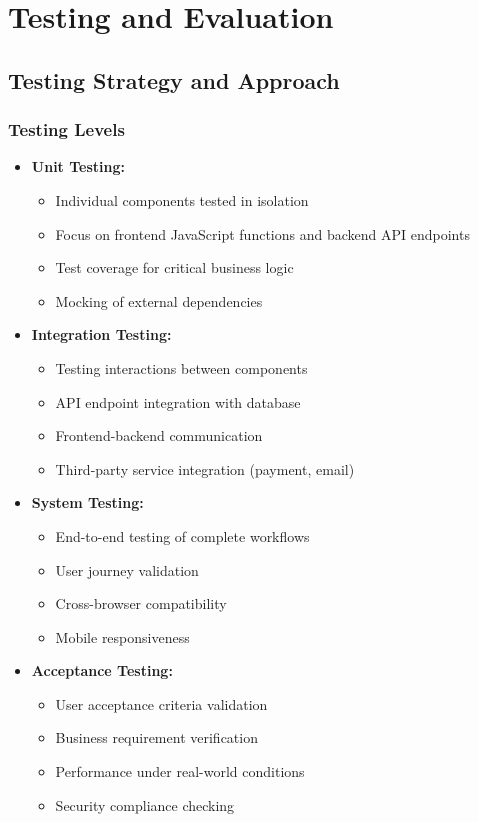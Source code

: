 \chapter{Testing and Evaluation}

\section{Testing Strategy and Approach}
\subsection{Testing Levels}
\begin{itemize}
    \item \textbf{Unit Testing:}
    \begin{itemize}
        \item Individual components tested in isolation
        \item Focus on frontend JavaScript functions and backend API endpoints
        \item Test coverage for critical business logic
        \item Mocking of external dependencies
    \end{itemize}
    
    \item \textbf{Integration Testing:}
    \begin{itemize}
        \item Testing interactions between components
        \item API endpoint integration with database
        \item Frontend-backend communication
        \item Third-party service integration (payment, email)
    \end{itemize}
    
    \item \textbf{System Testing:}
    \begin{itemize}
        \item End-to-end testing of complete workflows
        \item User journey validation
        \item Cross-browser compatibility
        \item Mobile responsiveness
    \end{itemize}
    
    \item \textbf{Acceptance Testing:}
    \begin{itemize}
        \item User acceptance criteria validation
        \item Business requirement verification
        \item Performance under real-world conditions
        \item Security compliance checking
    \end{itemize}
\end{itemize}

